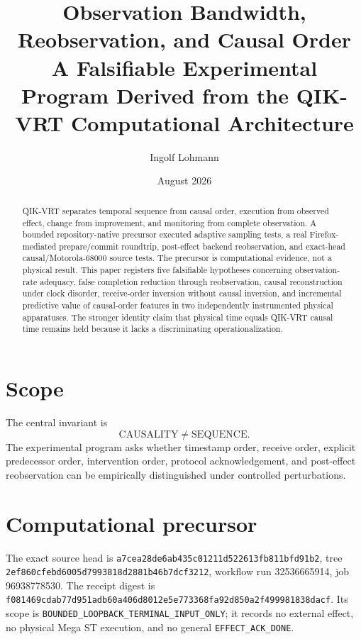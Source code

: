 \documentclass[11pt]{article}
\title{Observation Bandwidth, Reobservation, and Causal Order\\
\large A Falsifiable Experimental Program Derived from the QIK-VRT Computational Architecture}
\author{Ingolf Lohmann}
\date{August 2026}
\begin{document}
\maketitle

\begin{abstract}
QIK-VRT separates temporal sequence from causal order, execution from observed effect, change from improvement, and monitoring from complete observation. A bounded repository-native precursor executed adaptive sampling tests, a real Firefox-mediated prepare/commit roundtrip, post-effect backend reobservation, and exact-head causal/Motorola-68000 source tests. The precursor is computational evidence, not a physical result. This paper registers five falsifiable hypotheses concerning observation-rate adequacy, false completion reduction through reobservation, causal reconstruction under clock disorder, receive-order inversion without causal inversion, and incremental predictive value of causal-order features in two independently instrumented physical apparatuses. The stronger identity claim that physical time equals QIK-VRT causal time remains held because it lacks a discriminating operationalization.
\end{abstract}

\section{Scope}
The central invariant is
\[
\mathrm{CAUSALITY} \neq \mathrm{SEQUENCE}.
\]
The experimental program asks whether timestamp order, receive order, explicit predecessor order, intervention order, protocol acknowledgement, and post-effect reobservation can be empirically distinguished under controlled perturbations.

\section{Computational precursor}
The exact source head is \texttt{a7cea28de6ab435c01211d522613fb811bfd91b2}, tree \texttt{2ef860cfebd6005d7993818d2881b46b7dcf3212}, workflow run 32536665914, job 96938778530. The receipt digest is \texttt{f081469cdab77d951adb60a406d8012e5e773368fa92d850a2f499981838dacf}. Its scope is \texttt{BOUNDED\_LOOPBACK\_TERMINAL\_INPUT\_ONLY}; it records no external effect, no physical Mega ST execution, and no general \texttt{EFFECT\_ACK\_DONE}.
\end{document}
